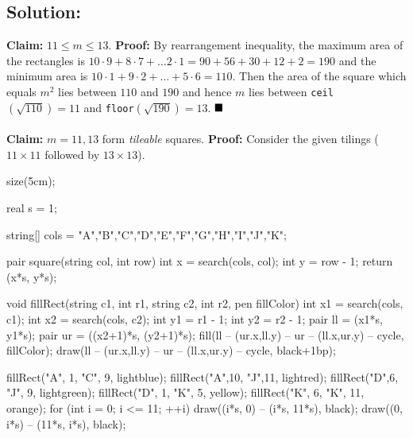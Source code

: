 \documentclass[fontsize=9pt]{scrartcl}
\begin{document}
	\subsection*{Solution:}
	\textbf{\textsf{Claim:}} $11 \leq m \leq 13$.
	\newline
	\textbf{\textsf{Proof:}} By rearrangement inequality, the maximum area of the
	rectangles is $10 \cdot 9+8 \cdot 7 + \dots 2 \cdot 1 = 90+56+30+12+2 = 190$
	and the minimum area is $10 \cdot 1 + 9 \cdot 2 + \dots + 5\cdot 6 = 110$. Then
	the area of the square which equals $m^{2}$ lies between $110$ and $190$ and hence
	$m$ lies between \texttt{ceil}$(\sqrt{110}) = 11$ and \texttt{floor}$(\sqrt{190}
	) = 13$. $\hfill \blacksquare$ ~\\ ~\\ \textbf{\textsf{Claim:}} $m=11,13$ form
	\emph{tileable} squares.
	\newline
	\textbf{\textsf{Proof:}} Consider the given tilings ($11 \times 11$ followed by
	$13 \times 13$).
	\newline
	\begin{center}
		\begin{asy}
			size(5cm);

            real s = 1;

            string[] cols =
			{"A","B","C","D","E","F","G","H","I","J","K"};

            pair square(string col, int row) { int x = search(cols, col); int y = row - 1; return (x*s, y*s); }

            void
			fillRect(string c1, int r1, string c2, int r2, pen fillColor) { int x1 = search(cols, c1); int x2 = search(cols, c2); 
                int y1 = r1 - 1; int y2 = r2 - 1; pair ll = (x1*s, y1*s); pair ur = ((x2+1)*s, (y2+1)*s); 
                fill(ll -- (ur.x,ll.y) -- ur -- (ll.x,ur.y) -- cycle, fillColor); 
                draw(ll -- (ur.x,ll.y) -- ur -- (ll.x,ur.y) -- cycle, black+1bp); }

            fillRect("A", 1, "C", 9, lightblue); 
			fillRect("A",10, "J",11, lightred); 
            fillRect("D",6, "J", 9, lightgreen); 
            fillRect("D", 1, "K", 5, yellow);
			fillRect("K", 6, "K", 11, orange); 
            for (int i = 0; i <= 11; ++i)
			{ draw((i*s, 0) -- (i*s, 11*s), black); draw((0, i*s) -- (11*s, i*s), black); }
		\end{asy}
	\end{center}
	~\\
\end{document}
